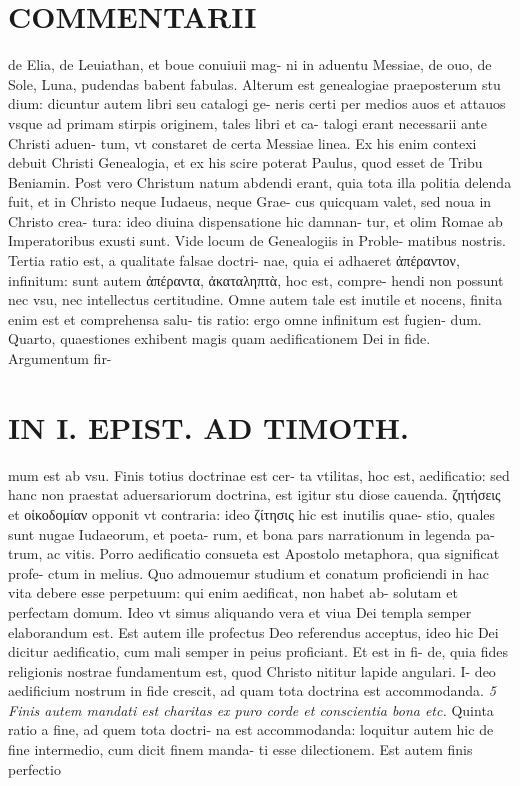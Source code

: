 \documentclass{article}
\begin{document}
\begin{pages}
\section*{COMMENTARII }
\marginpar{[ p.20 ]}\pstart de Elia, de Leuiathan, et boue conuiuii mag- ni in aduentu Messiae, de ouo, de Sole, Luna, pudendas babent fabulas.  \pend\pstart Alterum est genealogiae praeposterum stu dium: dicuntur autem libri seu catalogi ge- neris certi per medios auos et attauos vsque ad primam stirpis originem, tales libri et ca- talogi erant necessarii ante Christi aduen- tum, vt constaret de certa Messiae linea. Ex his enim contexi debuit Christi Genealogia, et ex his scire poterat Paulus, quod esset de Tribu Beniamin. Post vero Christum natum abdendi erant, quia tota illa politia delenda fuit, et in Christo neque Iudaeus, neque Grae- cus quicquam valet, sed noua in Christo crea- tura: ideo diuina dispensatione hic damnan- tur, et olim Romae ab Imperatoribus exusti sunt. Vide locum de Genealogiis in Proble- matibus nostris.  \pend\pstart Tertia ratio est, a qualitate falsae doctri- nae, quia ei adhaeret ἀπέραντον, infinitum: sunt autem ἀπέραντα, ἀκαταληπτὰ, hoc est, compre- hendi non possunt nec vsu, nec intellectus certitudine. Omne autem tale est inutile et nocens, finita enim est et comprehensa salu- tis ratio: ergo omne infinitum est fugien- dum.  \pend\pstart Quarto, quaestiones exhibent magis quam aedificationem Dei in fide. Argumentum fir-  \pend
\section*{IN I. EPIST. AD TIMOTH. }
\marginpar{[ p.21 ]}\pstart mum est ab vsu. Finis totius doctrinae est cer- ta vtilitas, hoc est, aedificatio: sed hanc non praestat aduersariorum doctrina, est igitur stu diose cauenda. ζητήσεις et οἰκοδομίαν opponit vt contraria: ideo ζίτησις hic est inutilis quae- stio, quales sunt nugae Iudaeorum, et poeta- rum, et bona pars narrationum in legenda pa- trum, ac vitis. Porro aedificatio consueta est Apostolo metaphora, qua significat profe- ctum in melius. Quo admouemur studium et conatum proficiendi in hac vita debere esse perpetuum: qui enim aedificat, non habet ab- solutam et perfectam domum. Ideo vt simus aliquando vera et viua Dei templa semper elaborandum est.  \pend\pstart Est autem ille profectus Deo referendus acceptus, ideo hic Dei dicitur aedificatio, cum mali semper in peius proficiant. Et est in fi- de, quia fides religionis nostrae fundamentum est, quod Christo nititur lapide angulari. I- deo aedificium nostrum in fide crescit, ad quam tota doctrina est accommodanda.  \pend
\textit{5 Finis autem mandati est charitas ex puro corde et conscientia bona etc. }\pstart Quinta ratio a fine, ad quem tota doctri- na est accommodanda: loquitur autem hic de fine intermedio, cum dicit finem manda- ti esse dilectionem. Est autem finis perfectio  \pend

\end{pages}
\end{document}
